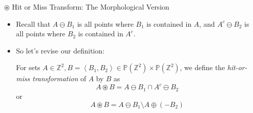 \documentclass{beamer}
\newcommand{\tuple}[1]{\left\langle #1 \right\rangle}
\newcommand{\intersect}{\cap}
\newcommand{\power}[1]{\mathbb{P}\left(#1\right)}
\newcommand{\dilate}{\oplus}
\newcommand{\erode}{\ominus}
\newcommand{\hitmiss}{\circledast}
\begin{document}
\begin{frame}{$\hitmiss$ Hit or Miss Transform: The Morphological Version}
  \begin{itemize}
   \item 
   Recall that $A \erode B_1$ is all points where $B_1$ is contained
        in $A$, and $A^c \erode B_2$ is all points where $B_2$ is contained
        in $A^c$.
    \item 
    So let's revise our definition:
     \begin{definition}
          For sets $A \in \mathbb{Z}^2,
                    B=\tuple{B_1,B_2}\in \power{\mathbb{Z}^2} \times
                                         \power{\mathbb{Z}^2}$,
          we define the \emph{hit-or-miss transformation} of
          $A$ by $B$ as
          $$A \hitmiss B = A \erode B_1 \intersect A^c \erode B_2$$
          or
          $$A \hitmiss B = A \erode B_1 \setminus A \dilate (-B_2)$$ 
        \end{definition}
   \end{itemize}
\end{frame}
\end{document}
